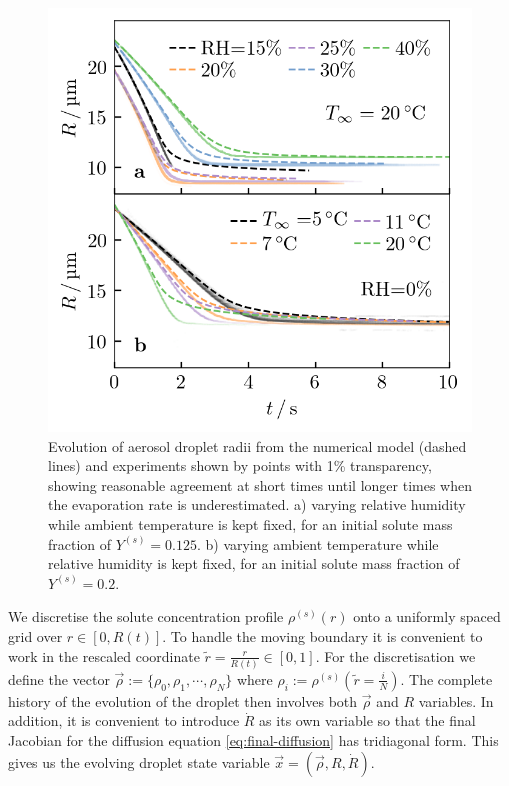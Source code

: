 \documentclass[11pt,twoside]{report}
\begin{document}
\begin{figure}
  \includegraphics[width=0.9\linewidth,outer]{nano3-trajectory}
  \caption[Evolution of drying droplet radii]{
    Evolution of  aerosol droplet radii from the numerical model (dashed lines) and experiments shown by points with 1\% transparency, showing reasonable agreement at short times until longer times when the evaporation rate is underestimated.
    a) varying relative humidity while ambient temperature is kept fixed, for an initial solute mass fraction of $Y^{(s)} = 0.125$.
    b) varying ambient temperature while relative humidity is kept fixed, for an initial solute mass fraction of $Y^{(s)} = 0.2$.}
  \label{fig:nano3-trajectory}
\end{figure}

We discretise the solute concentration profile $\rho^{(s)}(r)$ onto a uniformly spaced grid over $r \in [0, R(t)]$.
To handle the moving boundary it is convenient to work in the rescaled coordinate $\tilde{r} = \frac{r}{R(t)} \in [0, 1]$.
For the discretisation we define the vector $\vec{\rho} := \{\rho_0, \rho_1, \cdots, \rho_N\}$ where $\rho_i := \rho^{(s)}\left(\tilde{r} = \frac{i}{N}\right)$.
The complete history of the evolution of the droplet then involves both $\vec{\rho}$ and $R$ variables.
In addition, it is convenient to introduce $\dot{R}$ as its own variable so that the final Jacobian for the diffusion equation \eqref{eq:final-diffusion} has tridiagonal form.
This gives us the evolving droplet state variable $\vec{x} = (\vec{\rho}, R, \dot{R})$.
\end{document}
